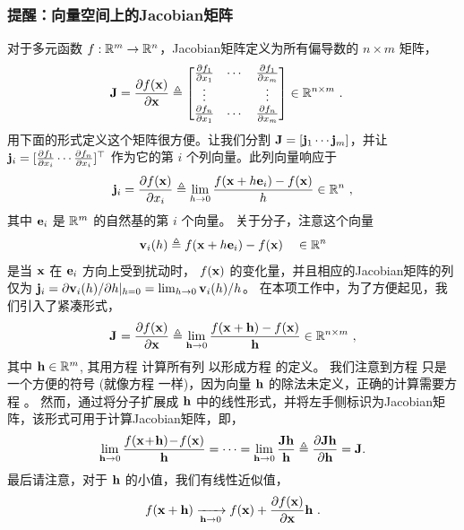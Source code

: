 \subsubsection[Jacobians on vector spaces]{提醒：向量空间上的Jacobian矩阵}

对于多元函数 $f:{\mathbb R}^m\to{\mathbb R}^n$，Jacobian矩阵定义为所有偏导数的 $n\times m$ 矩阵， 
%
\begin{align}\label{equ:jac_Rn_matrix}
{\bf J} = \frac{\partial f({\bf x})}{\partial{\bf x}} &\triangleq \begin{bmatrix}
\frac{\partial f_1}{\partial x_1} & \cdots & \frac{\partial f_1}{\partial x_m} \\
\vdots && \vdots \\
\frac{\partial f_n}{\partial x_1} & \cdots & \frac{\partial f_n}{\partial x_m} 
\end{bmatrix} \in{\mathbb R}^{n\times m}
~.
\end{align}
%
用下面的形式定义这个矩阵很方便。让我们分割 ${\bf J}=[{\bf j}_1\cdots{\bf j}_m]$，并让 ${\bf j}_i=[\frac{\partial f_1}{\partial x_i}\cdots\frac{\partial f_n}{\partial x_i}]^{\top}$ 作为它的第 $i$ 个列向量。此列向量响应于
%
\begin{align}\label{equ:jac_Rn_i}
{\bf j}_i = \frac{\partial f({\bf x})}{\partial x_i} \triangleq \lim_{h\to0}\frac{f({\bf x}+h{\bf e}_i)-f({\bf x})}{h} \in {\mathbb R}^n
~,
\end{align}
%
其中 ${\bf e}_i$ 是 ${\mathbb R}^m$ 的自然基的第 $i$ 个向量。
关于分子，注意这个向量 
%
\begin{align}\label{equ:jac_Rn_vec}
{\bf v}_i(h) \triangleq f({\bf x}+h{\bf e}_i)-f({\bf x}) \quad \in{\mathbb R}^n
\end{align}
%
是当 ${\bf x}$ 在 ${\bf e}_i$ 方向上受到扰动时， $f({\bf x})$ 的变化量，并且相应的Jacobian矩阵的列仅为 ${\bf j}_i=\partial{\bf v}_i(h)/\partial h|_{h=0}=\lim_{h\to0}{\bf v}_i(h)/h$。
在本项工作中，为了方便起见，我们引入了紧凑形式，
%
\begin{align}\label{equ:jac_Rn}
{{\bf J}^{}_{}}=\frac{\partial f({\bf x})}{\partial{\bf x}}\triangleq\lim_{{\bf h}\to0}\frac{f({\bf x}+{\bf h})-f({\bf x})}{{\bf h}}
\in{\mathbb R}^{n\times m}
~,
\end{align}
%
其中 ${\bf h}\in{\mathbb R}^m$, 其用方程  计算所有列
以形成方程  的定义。
我们注意到方程  只是一个方便的符号 (就像方程  一样)，因为向量 ${\bf h}$ 的除法未定义，正确的计算需要方程  。
然而，通过将分子扩展成 ${\bf h}$ 中的线性形式，并将左手侧标识为Jacobian矩阵，该形式可用于计算Jacobian矩阵，即，
%
\begin{align}\label{equ:jac_Rn_identify}
 \lim_{{\bf h}\to0}\frac{f({\bf x}\!+\!{\bf h})\!-\!f({\bf x})}{{\bf h}} 
 = \cdots
 = \lim_{{\bf h}\to0}\frac{{\bf J}{\bf h}}{{\bf h}}  
 \triangleq \frac{\partial{\bf J}{\bf h}}{\partial{\bf h}} 
 = {\bf J}.
\end{align}
%
最后请注意，对于 ${\bf h}$ 的小值，我们有线性近似值，
%
\begin{align}
f({\bf x}+{\bf h}) \xrightarrow[{\bf h}\to0]{} f({\bf x}) + \frac{\partial f({\bf x})}{\partial{\bf x}}{\bf h}
~.
\end{align}

